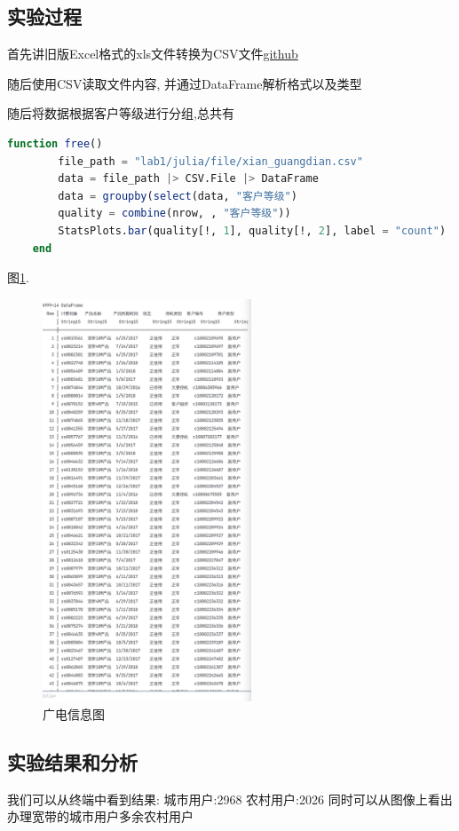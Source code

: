 \documentclass[a4paper]{article}
\begin{document}
\subsection{实验过程} \label{sub:ptxproc}

首先讲旧版Excel格式的xls文件转换为CSV文件\href{"https://github.com/lovebaihezi/lab/blob/main/data-process/lab1/julia/file/xian_guangdian.csv"}{github}

随后使用CSV读取文件内容, 并通过DataFrame解析格式以及类型

随后将数据根据客户等级进行分组,总共有

\begin{lstlisting}[language=julia]
    function free()
        file_path = "lab1/julia/file/xian_guangdian.csv"
        data = file_path |> CSV.File |> DataFrame
        data = groupby(select(data, "客户等级")
        quality = combine(nrow, , "客户等级"))
        StatsPlots.bar(quality[!, 1], quality[!, 2], label = "count")
    end
\end{lstlisting}

图\ref{fig:singleblock}. 

\begin{figure}[ht]
 \centering
 \includegraphics[height=12cm]{images/广电信息CSV展示.png}
 \caption{广电信息图}
 \label{fig:singleblock}
\end{figure}

\subsection{实验结果和分析}\label{sub:ptxeva}
我们可以从终端中看到结果:
城市用户:2968
农村用户:2026
同时可以从图像上看出办理宽带的城市用户多余农村用户
\end{document}
